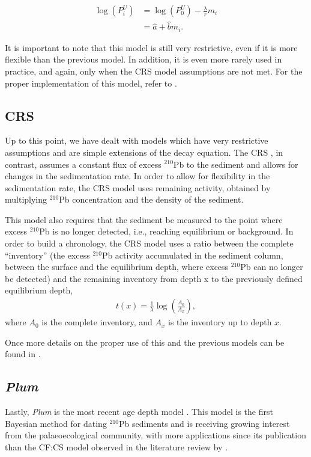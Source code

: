 \documentclass [10pt] {article}
\begin{document}
\begin{eqnarray}
	\log(P_i^U) &= \log(P_0^U) - \frac{\lambda}{r}m_i \\
		   &= \hat{a} + \hat{b}m_i.
\end{eqnarray}

It is important to note that this model is still very restrictive, even if it is more flexible than the previous model. 
In addition, it is even more rarely used in practice, and again, only when the CRS model assumptions are not met.
For the proper implementation of this model, refer to \citet{Sanchez-Cabeza2012}.


\subsection{CRS}

Up to this point, we have dealt with models which have very restrictive assumptions and are simple extensions of the decay equation. 
The CRS \citep{Appleby1978,Appleby1998,Appleby2001,Appleby2008}, in contrast, assumes a constant flux of excess $^{210}$Pb to the sediment and allows for changes in the sedimentation rate. 
In order to allow for flexibility in the sedimentation rate, the CRS model uses remaining activity, obtained by multiplying $^{210}$Pb concentration and the density of the sediment. 

This model also requires that the sediment be measured to the point where excess $^{210}$Pb is no longer detected, i.e., reaching equilibrium or background.
In order to build a chronology, the CRS model uses a ratio between the complete “inventory” (the excess $^{210}$Pb activity accumulated in the sediment column, between the surface and the equilibrium depth, where excess $^{210}$Pb can no longer be detected) and the remaining inventory from depth x to the previously defined equilibrium depth,
\begin{eqnarray}
	t(x)=\frac{1}{\lambda}\log\left( \frac{A_0}{A_x}\right),
\end{eqnarray}
where $A_0$ is the complete inventory, and $A_x$ is the inventory up to depth $x$.


Once more details on the proper use of this and the previous models can be found in \citet{Sanchez-Cabeza2012}.

\subsection{\textit{Plum}}

Lastly, \textit{Plum} is the most recent age depth model \citep{Aquino2018}.
This model is the first Bayesian method for dating $^{210}$Pb sediments and is receiving growing interest from the palaeoecological community, with more applications since its publication than the CF:CS model observed in the literature review by \citet{Courtney2019}.
\end{document}
